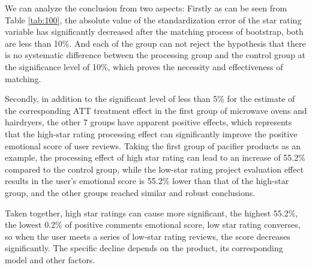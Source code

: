 \documentclass{mcmthesis}
\begin{document}
We can analyze the conclusion from two aspects: Firstly as can be seen from Table \ref{tab:100}, the absolute value of the standardization error of the star rating variable has significantly decreased after the matching process of bootstrap, both are less than 10\%. And each of the group can not reject the hypothesis that there is no systematic difference between the processing group and the control group at the significance level of 10\%, which proves the necessity and effectiveness of matching.

Secondly, in addition to the significant level of less than 5\% for the estimate of the corresponding ATT treatment effect in the first group of microwave ovens and hairdryers, the other 7 groups have apparent positive effects, which represents that the high-star rating processing effect can significantly improve the positive emotional score of user reviews. Taking the first group of pacifier products as an example, the processing effect of high star rating can lead to an increase of 55.2\% compared to the control group, while the low-star rating project evaluation effect results in the user's emotional score is 55.2\% lower than that of the high-star group, and the other groups reached similar and robust conclusions. 

Taken together, high star ratings can cause more significant, the highest 55.2\%, the lowest 0.2\% of positive comments emotional score, low star rating converses, so when the user meets a series of low-star rating reviews, the score decreases significantly. The specific decline depends on the product, its corresponding model and other factors.
\end{document}

